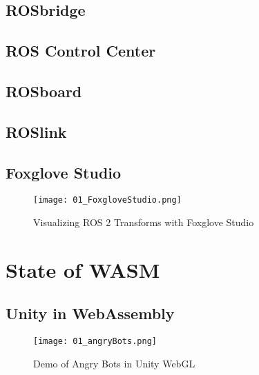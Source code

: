     \subsection{ROSbridge}

    \subsection{ROS Control Center}

    \subsection{ROSboard}

    \subsection{ROSlink}

    \subsection{Foxglove Studio}

        \begin{figure}[htbp]
            \centering
            \texttt{[image: 01\_FoxgloveStudio.png]}
            \caption{Visualizing ROS 2 Transforms with Foxglove Studio}
        \end{figure}

\section{State of WASM}

    \subsection{Unity in WebAssembly}


    \begin{figure}[htbp]
        \centering
        \texttt{[image: 01\_angryBots.png]}
        \caption{Demo of Angry Bots in Unity WebGL}\label{fig:unity}
    \end{figure}
